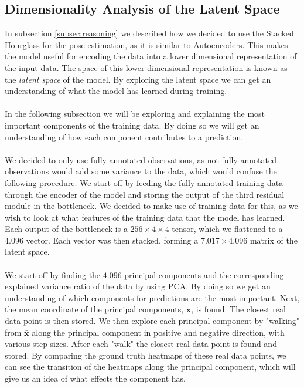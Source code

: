 \documentclass[./main.tex]{subfiles}
\begin{document}
\subsection{Dimensionality Analysis of the Latent Space}\label{subsec:shape_analysis}
In subsection \ref{subsec:reasoning} we described how we decided to use the Stacked Hourglass for the pose estimation, as it is similar to Autoencoders. This makes the model useful for encoding the data into a lower dimensional representation of the input data. The space of this lower dimensional representation is known as the \textit{latent space} of the model. By exploring the latent space we can get an understanding of what the model has learned during training.
\\
\\
In the following subsection we will be exploring and explaining the most important components of the training data. By doing so we will get an understanding of how each component contributes to a prediction.
\\
\\
We decided to only use fully-annotated observations, as not fully-annotated observations would add some variance to the data, which would confuse the following procedure. We start off by feeding the fully-annotated training data through the encoder of the model and storing the output of the third residual module in the bottleneck. We decided to make use of training data for this, as we wish to look at what features of the training data that the model has learned. Each output of the bottleneck is a $256 \times 4 \times 4$ tensor, which we flattened to a $4.096$ vector. Each vector was then stacked, forming a $7.017 \times 4.096$ matrix of the latent space.
\\
\\
We start off by finding the $4.096$ principal components and the corresponding explained variance ratio of the data by using PCA. By doing so we get an understanding of which components for predictions are the most important. Next, the mean coordinate of the principal components, $\bar{\bm{x}}$, is found. The closest real data point is then stored. We then explore each principal component by "walking" from $\bar{\bm{x}}$ along the principal component in positive and negative direction, with various step sizes. After each "walk" the closest real data point is found and stored. By comparing the ground truth heatmaps of these real data points, we can see the transition of the heatmaps along the principal component, which will give us an idea of what effects the component has.
\end{document}

